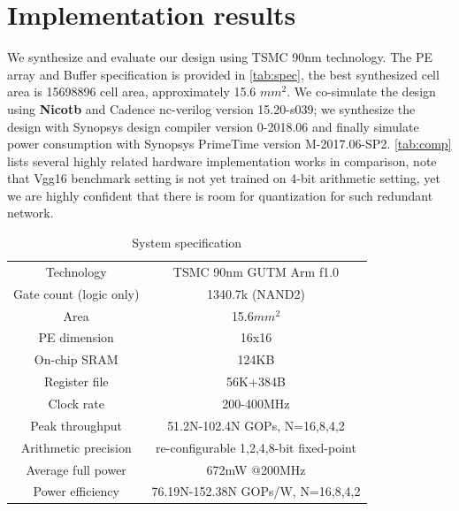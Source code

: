 \section{Implementation results}
We synthesize and evaluate our design using TSMC 90nm technology. The PE array and Buffer specification is provided in \autoref{tab:spec}, the best synthesized cell area is 15698896 cell area, approximately 15.6 $mm^2$. We co-simulate the design using \textbf{Nicotb}\cite{nicotb} and Cadence nc-verilog version 15.20-s039; we synthesize the design with Synopsys design compiler version 0-2018.06 and finally simulate power consumption with Synopsys PrimeTime version M-2017.06-SP2. \autoref{tab:comp} lists several highly related hardware implementation works in comparison, note that Vgg16 benchmark setting is not yet trained on 4-bit arithmetic setting, yet we are highly confident that there is room for quantization for such redundant network. \\
\begin{table}[h]
    \caption{System specification}
    \label{tab:spec}
    \centering
    \footnotesize 
        \begin{tabular}{c|c}
        \toprule
        \midrule
        Technology & TSMC 90nm GUTM Arm f1.0\\
        Gate count (logic only) & 1340.7k (NAND2)\\
        Area & 15.6$mm^2$\\
        PE dimension & 16x16\\
        On-chip SRAM & 124KB\\
        Register file & 56K+384B\\
        Clock rate & 200-400MHz\\
        Peak throughput & 51.2N-102.4N GOPs, N=16,8,4,2\\
        Arithmetic precision & re-configurable 1,2,4,8-bit fixed-point\\
        Average full power & 672mW @200MHz\\
        Power efficiency & 76.19N-152.38N GOPs/W, N=16,8,4,2\\
        \bottomrule
        \end{tabular}
\end{table}

